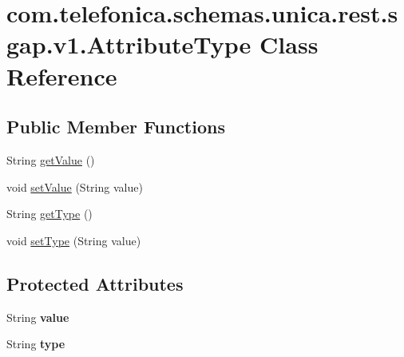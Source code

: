 \hypertarget{classcom_1_1telefonica_1_1schemas_1_1unica_1_1rest_1_1sgap_1_1v1_1_1AttributeType}{
\section{com.telefonica.schemas.unica.rest.sgap.v1.AttributeType Class Reference}
\label{classcom_1_1telefonica_1_1schemas_1_1unica_1_1rest_1_1sgap_1_1v1_1_1AttributeType}
}
\subsection*{Public Member Functions}
\begin{DoxyCompactItemize}
\item 
String \hyperlink{classcom_1_1telefonica_1_1schemas_1_1unica_1_1rest_1_1sgap_1_1v1_1_1AttributeType_af55c39befd1cf5d69ba2a2b84a38d6f6}{getValue} ()
\item 
void \hyperlink{classcom_1_1telefonica_1_1schemas_1_1unica_1_1rest_1_1sgap_1_1v1_1_1AttributeType_a57d8a82cc0350d21ea4dbe069ba69495}{setValue} (String value)
\item 
String \hyperlink{classcom_1_1telefonica_1_1schemas_1_1unica_1_1rest_1_1sgap_1_1v1_1_1AttributeType_a487dbad18a231285d0c2f42b21ca1a70}{getType} ()
\item 
void \hyperlink{classcom_1_1telefonica_1_1schemas_1_1unica_1_1rest_1_1sgap_1_1v1_1_1AttributeType_a7b8446bb0989c34e6336422b51545743}{setType} (String value)
\end{DoxyCompactItemize}
\subsection*{Protected Attributes}
\begin{DoxyCompactItemize}
\item 
\hypertarget{classcom_1_1telefonica_1_1schemas_1_1unica_1_1rest_1_1sgap_1_1v1_1_1AttributeType_a6305a99e4e1011c4747eda5b73b15434}{
String {\bfseries value}}
\label{classcom_1_1telefonica_1_1schemas_1_1unica_1_1rest_1_1sgap_1_1v1_1_1AttributeType_a6305a99e4e1011c4747eda5b73b15434}

\item 
\hypertarget{classcom_1_1telefonica_1_1schemas_1_1unica_1_1rest_1_1sgap_1_1v1_1_1AttributeType_a3253dfb2c9eeef7dac737fb3c2fc3d48}{
String {\bfseries type}}
\label{classcom_1_1telefonica_1_1schemas_1_1unica_1_1rest_1_1sgap_1_1v1_1_1AttributeType_a3253dfb2c9eeef7dac737fb3c2fc3d48}

\end{DoxyCompactItemize}


